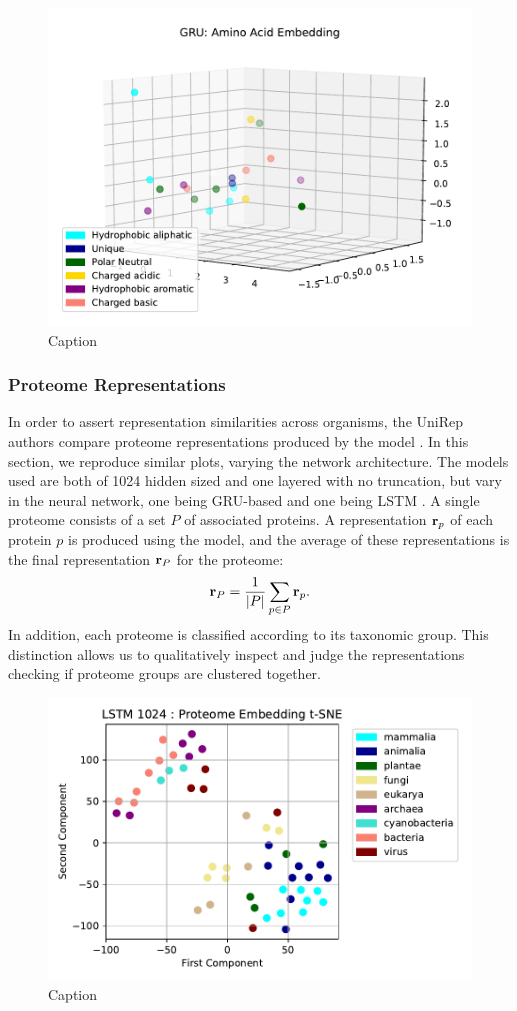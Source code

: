 \documentclass[a4paper,12pt]{article}
\begin{document}
\begin{figure}[H]
    \centering
    \includegraphics[width=0.8\linewidth]{figures/fig2a_GRU.pdf}
    \caption{Caption}
    \label{fig:fig2a_GRU}
\end{figure}

\subsubsection{Proteome Representations}

In order to assert representation similarities across organisms, the UniRep authors compare proteome representations produced by the model \cite{alley2019unified}. In this section, we reproduce similar plots, varying the network architecture. The models used are both of 1024 hidden sized and one layered with no truncation, but vary in the neural network, one being GRU-based and one being LSTM . A single proteome consists of a set $P$ of associated proteins. A representation $\mathbf{ r }_p$ of each protein $p$ is produced using the model, and the average of these representations is the final representation $\mathbf{ r }_P$ for the proteome:
\[ \mathbf{ r }_P = \frac{1}{|P|} \sum_{p \in P} \mathbf{ r }_p. \]
In addition, each proteome is classified according to its taxonomic group. This distinction allows us to qualitatively inspect and judge the representations checking if proteome groups are clustered together.

\begin{figure}[H]
    \centering
    \includegraphics[width=0.8\linewidth]{figures/fig2b_LSTM_1024_no_trunc.pdf}
    \caption{Caption}
    \label{fig:fig2b_LSTM}
\end{figure}
\end{document}
